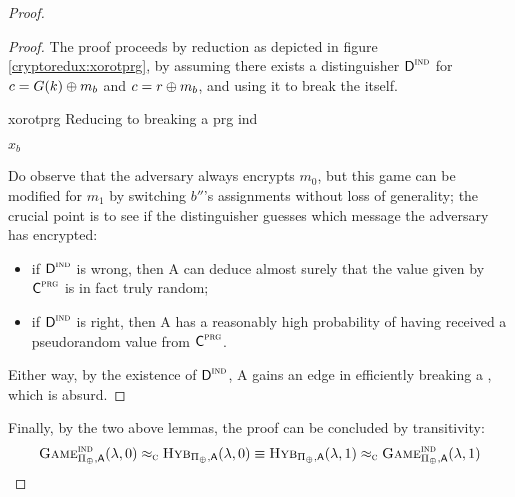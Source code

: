 \begin{proof}
    \begin{proof}
        The proof proceeds by reduction as depicted in figure \ref{cryptoredux:xorotprg}, by assuming there exists a distinguisher $\textsf{D}^{\textsc{ind}}$ for $c = G(k) \oplus m_{b}$ and $c = r \oplus m_{b}$, and using it to break the \prg{} itself.

        \begin{cryptoredux}
            {xorotprg}
            {Reducing to breaking a \prg}
            {prg}
            {ind}

            {$x_b$}{}




            \cseqdelay

        \end{cryptoredux}

        Do observe that the adversary always encrypts $m_0$, but this game can be modified for $m_1$ by switching $b''$'s assignments without loss of generality; the crucial point is to see if the distinguisher guesses which message the adversary has encrypted:
        \begin{itemize}
            \item if $\textsf{D}^\textsc{ind}$ is wrong, then \textsf{A} can deduce almost surely that the value given by $\textsf{C}^\textsc{prg}$ is in fact truly random;
            \item if $\textsf{D}^\textsc{ind}$ is right, then \textsf{A} has a reasonably high probability of having received a pseudorandom value from $\textsf{C}^\textsc{prg}$.
        \end{itemize} 

        Either way, by the existence of $\textsf{D}^\textsc{ind}$, \textsf{A} gains an edge in efficiently breaking a \prg{}, which is absurd.
    \end{proof}

    Finally, by the two above lemmas, the proof can be concluded by transitivity:
    \[
        \textsc{Game}_{\Pi_{\oplus}, \textsf{A}}^{\textsc{ind}}(\lambda, 0) \approx_\textsc{c}
        \textsc{Hyb}_{\Pi_{\oplus}, \textsf{A}}(\lambda, 0) \equiv
        \textsc{Hyb}_{\Pi_{\oplus}, \textsf{A}}(\lambda, 1) \approx_\textsc{c}
        \textsc{Game}_{\Pi_{\oplus}, \textsf{A}}^{\textsc{ind}}(\lambda, 1)
    \]

\end{proof}
 

